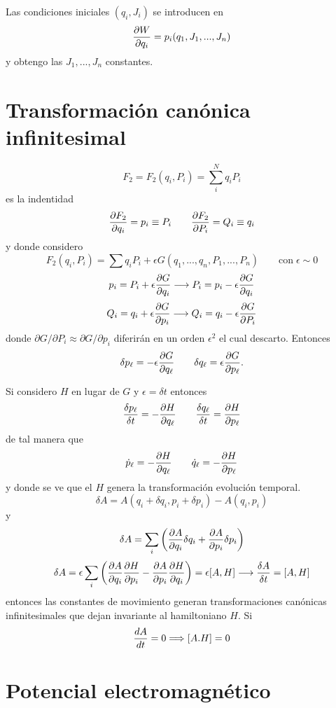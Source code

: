 \documentclass[10pt,oneside]{CBFT_book}
\begin{document}
Las condiciones iniciales $(q_i, J_i)$ se introducen en
\[
	\dpar{W}{q_i} = p_i(q_1,J_1,...,J_n)
\]
y obtengo las $J_1, ..., J_n$ constantes.

\section{Transformación canónica infinitesimal}

\[
	F_2 = 	F_2(q_i,P_i) = \sum_i^N q_iP_i
\]
es la indentidad
\[
	\dpar{F_2}{q_i} =  p_i \equiv P_i \qquad \dpar{F_2}{P_i} =  Q_i \equiv q_i
\]
y donde considero
\[
	F_2(q_i,P_i) = \sum q_i P_i + \epsilon G(q_1,...,q_n,P_1,...,P_n) \qquad \textrm{con} \; \epsilon \sim 0
\]
\[
	p_i = P_i + \epsilon\dpar{G}{q_i} \longrightarrow P_i = p_i - \epsilon\dpar{G}{q_i} 
\]
\[
	Q_i = q_i + \epsilon\dpar{G}{p_i} \longrightarrow Q_i = q_i - \epsilon\dpar{G}{P_i} 	
\]
donde $\partial G/\partial P_i \approx \partial G/\partial p_i$ diferirán en un orden $\epsilon^2$ el cual
descarto. Entonces
\[
	\delta p_\ell = -\epsilon \dpar{G}{q_\ell} \qquad \delta q_\ell = \epsilon \dpar{G}{p_\ell}.
\]

Si considero $H$ en lugar de $G$ y $\epsilon = \delta t$ entonces
\[
	\frac{\delta p_\ell}{\delta t} = -\dpar{H}{q_\ell} \qquad \frac{\delta q_\ell}{\delta t} = \dpar{H}{p_\ell}
\]
de tal manera que 
\[
	\dot{p}_\ell = -\dpar{H}{q_\ell} \qquad \dot{q}_\ell = -\dpar{H}{p_\ell}
\]
y donde se ve que el $H$ genera la transformación evolución temporal.
\[
	\delta A = A(q_i + \delta q_i, p_i + \delta p_i) - A(q_i,p_i)
\]
y
\[
	\delta A = \sum_i \left( \dpar{A}{q_i} \delta q_i + \dpar{A}{p_i} \delta p_i \right)
\]
\[
	\delta A = \epsilon \sum_i \left( \dpar{A}{q_i} \dpar{H}{p_i} - \dpar{A}{p_i} \dpar{H}{q_i} \right) =
	\epsilon[A,H] \longrightarrow \frac{\delta A}{\delta t} = [A,H]
\]
entonces las constantes de movimiento generan transformaciones canónicas infinitesimales que dejan invariante
al hamiltoniano $H$. Si
\[
	\dtot{A}{t} = 0 \Longrightarrow [A.H] = 0
\]

\section{Potencial electromagnético}
\end{document}
